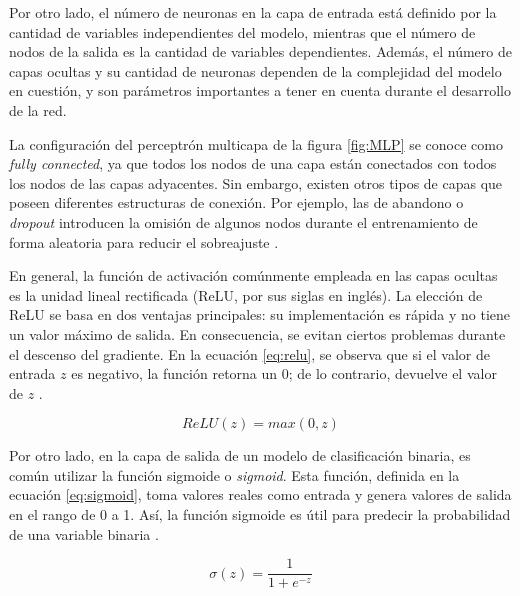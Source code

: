 Por otro lado, el número de neuronas en la capa de entrada está definido por la cantidad de variables independientes 
del modelo, mientras que el número de nodos de la salida es la cantidad de variables dependientes. Además, el número de 
capas ocultas y su cantidad de neuronas dependen de la complejidad del modelo en cuestión, y son parámetros importantes 
a tener en cuenta durante el desarrollo de la red\citep{CITE:42}.

La configuración del perceptrón multicapa de la figura \ref{fig:MLP} se conoce como \emph{fully connected}, ya que todos 
los nodos de una capa están conectados con todos los nodos de las capas adyacentes. Sin embargo, existen otros tipos de 
capas que poseen diferentes estructuras de conexión. Por ejemplo, las de abandono o \emph{dropout} introducen la omisión de 
algunos nodos durante el entrenamiento de forma aleatoria para reducir el sobreajuste \citep{CITE:44} \citep{CITE:45}.

En general, la función de activación comúnmente empleada en las capas ocultas es la unidad lineal rectificada (ReLU, 
por sus siglas en inglés). La elección de ReLU se basa en dos ventajas principales: su implementación es rápida y no 
tiene un valor máximo de salida. En consecuencia, se evitan ciertos problemas durante el descenso del gradiente. En la 
ecuación \ref{eq:relu}, se observa que si el valor de entrada $z$ es negativo, la función retorna un 0; de lo contrario, 
devuelve el valor de $z$ \citep{CITE:44}. 


\begin{equation}
	\label{eq:relu}
	ReLU(z) = max(0, z)
\end{equation}

Por otro lado, en la capa de salida de un modelo de clasificación binaria, es común utilizar la función sigmoide o 
\emph{sigmoid}. Esta función, definida en la ecuación \ref{eq:sigmoid}, toma valores reales como entrada y genera 
valores de salida en el rango de 0 a 1. Así, la función sigmoide es útil para predecir la probabilidad de una 
variable binaria \citep{CITE:44}. 

\begin{equation}
	\label{eq:sigmoid}
	\sigma(z) = \frac{1} {1 + e^{-z}}
\end{equation}


